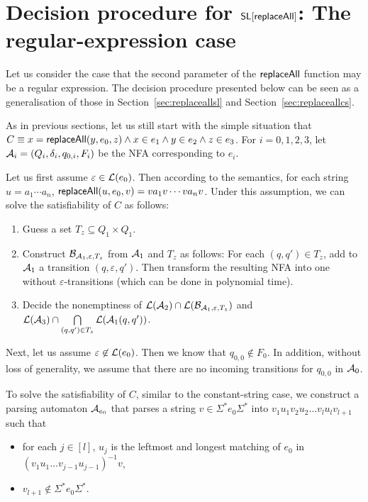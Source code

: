 
\section{Decision procedure for $\mathsf{SL}[\mathsf{replaceAll}]$: The regular-expression case} \label{sec:replaceallre}

Let us consider the case that the second parameter of the $\mathsf{replaceAll}$ function may be a regular expression.  The decision procedure presented below can be  seen as a generalisation of those in Section~\ref{sec:replaceallsl} and Section~\ref{sec:replaceallcs}. 

As in previous sections, let us still start with the simple situation that $C \equiv x = \mathsf{replaceAll}(y, e_0, z) \wedge x \in e_1 \wedge y \in e_2 \wedge z \in e_3$. For $i=0,1,2,3$, let $\mathcal{A}_i = (Q_i, \delta_i, q_{0,i}, F_i)$ be the NFA corresponding to $e_i$. 

Let us first assume $\varepsilon \in \mathcal{L}(e_0)$. Then according to the semantics, for each string $u = a_1 \cdots a_n$, $\mathsf{replaceAll}(u, e_0, v) = v a_1 v \cdots v a_n v$. Under this assumption, we can solve the satisfiability of $C$ as follows: 
\begin{enumerate}
\item Guess a set $T_z \subseteq Q_1 \times Q_1$. 
%
\item Construct $\mathcal{B}_{\mathcal{A}_1, \varepsilon, T_z}$ from $\mathcal{A}_1$ and $T_z$ as follows: For each $(q,q') \in T_z$, add to $\mathcal{A}_1$ a transition $(q, \varepsilon, q')$. Then transform the resulting NFA into one without $\varepsilon$-transitions (which can be done in polynomial time).
%
\item  Decide the nonemptiness of $\mathcal{L}(\mathcal{A}_2) \cap \mathcal{L}(\mathcal{B}_{\mathcal{A}_1, \varepsilon, T_z})$ and $\mathcal{L}(\mathcal{A}_3) \cap \bigcap \limits_{(q,q') \in T_z} \mathcal{L}(\mathcal{A}_1(q,q'))$.
\end{enumerate}

Next, let us assume $\varepsilon \not \in \mathcal{L}(e_0)$. Then we know that $q_{0,0} \not \in F_0$. In addition, without loss of generality, we assume that there are no incoming transitions for $q_{0,0}$ in $\mathcal{A}_0$.

To solve the satisfiability of $C$, similar to the constant-string case, we construct a parsing automaton $\mathcal{A}_{e_0}$ that parses a string $v \in \Sigma^\ast e_0 \Sigma^\ast$ into $v_1 u_1 v_2 u_2 \dots v_l u_l v_{l+1}$ such that 
\begin{itemize}
	\item for each $j \in [l]$, $u_j$ is the leftmost and longest matching of $e_0$ in $(v_1 u_1 \dots v_{j-1} u_{j-1})^{-1} v$,
	\item $v_{l+1} \not \in \Sigma^\ast e_0 \Sigma^\ast$.
\end{itemize}


